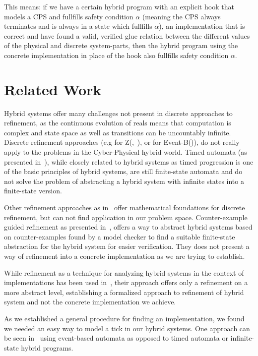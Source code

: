This means: if we have a certain hybrid program with an explicit hook that models a CPS and fullfills safety condition \(\alpha\) (meaning the CPS always terminates and is always in a state which fullfills \(\alpha\)), an implementation that is correct and have found a valid, verified glue relation between the different values of the physical and discrete system-parts, then the hybrid program using the concrete implementation in place of the hook also fullfills safety condition \(\alpha\).

\section{Related Work}
\label{sec:related}

Hybrid systems offer many challenges not present in discrete approaches to refinement, as the continuous evolution of reals means that computation is complex and state space as well as transitions can be uncountably infinite. Discrete refinement approaches (e.g for Z(\cite{ZRef},~\cite{ZBookRef}), or for Event-B(\cite{EventB})), do not really apply to the problems in the Cyber-Physical hybrid world.  Timed automata (as presented in~\cite{Alur94atheory}), while closely related to hybrid systems as timed progression is one of the basic principles of hybrid systems, are still finite-state automata and do not solve the problem of abstracting a hybrid system with infinite states into a finite-state version.

Other refinement approaches as in~\cite{RefCalcBook} offer mathematical foundations for discrete refinement, but can not find application in our problem space. Counter-example guided refinement as presented in~\cite{CounterExample}, offers a way to abstract hybrid systems based on counter-examples found by a model checker to find a suitable finite-state abstraction for the hybrid system for easier verification. They does not present a way of refinement into a concrete implementation as we are trying to establish.

While refinement as a technique for analyzing hybrid systems in the context of implementations has been used in~\cite{RefCalc}, their approach offers only a refinement on a more abstract level, establishing a formalized approach to refinement of hybrid system and not the concrete implementation we achieve. 

As we established a general procedure for finding an implementation, we found we needed an easy way to model a tick in our hybrid systems. One approach can be seen in~\cite{Raskin96stateclock} using event-based automata as opposed to timed automata or infinite-state hybrid programs.

